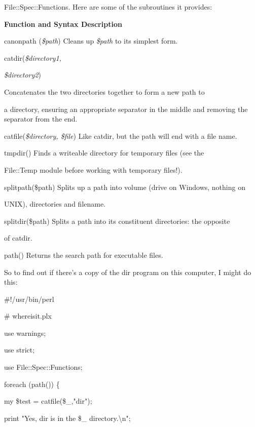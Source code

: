 \documentclass[a4paper,11pt]{book}
\begin{document}
\noindent File::Spec::Functions. Here are some of the subroutines it provides:

\noindent 

\noindent \textbf{Function and Syntax Description}

\noindent 

\noindent canonpath (\textit{\$path}) Cleans up \textit{\$path }to its simplest form.

\noindent catdir(\textit{\$directory1,}

\noindent \textit{\$directory2})

\noindent Concatenates the two directories together to form a new path to

\noindent a directory, ensuring an appropriate separator in the middle and removing the separator from the end.

\noindent catfile(\textit{\$directory, \$file}) Like catdir, but the path will end with a file name.

\noindent tmpdir() Finds a writeable directory for temporary files (see the

\noindent File::Temp module before working with temporary files!).

\noindent splitpath(\$path) Splits up a path into volume (drive on Windows, nothing on

\noindent UNIX), directories and filename.

\noindent splitdir(\$path) Splits a path into its constituent directories: the opposite

\noindent of catdir.

\noindent path() Returns the search path for executable files.

\noindent 

\noindent So to find out if there's a copy of the dir program on this computer, I might do this:

\noindent 

\noindent \#!/usr/bin/perl

\noindent \# whereisit.plx

\noindent use warnings;

\noindent use strict;

\noindent 

\noindent use File::Spec::Functions;

\noindent foreach (path()) \{

\noindent my \$test = catfile(\$\_,"dir");

\noindent print "Yes, dir is in the \$\_  directory.\textbackslash n";
\end{document}
